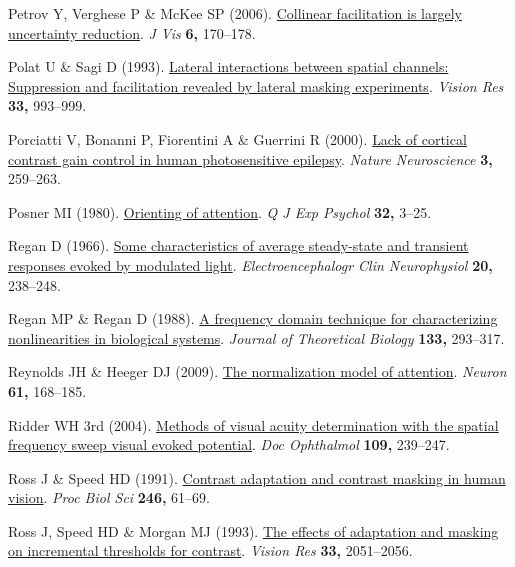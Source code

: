 \documentclass[
  letterpaper,
  DIV=11,
  numbers=noendperiod]{scrartcl}
\newlength{\cslhangindent}
\newenvironment{CSLReferences}[2] %
 {\begin{list}{}{%
  \setlength{\itemindent}{0pt}
  \setlength{\leftmargin}{0pt}
  \setlength{\parsep}{0pt}
  \ifodd #1
   \setlength{\leftmargin}{\cslhangindent}
   \setlength{\itemindent}{-1\cslhangindent}
  \fi
  \setlength{\itemsep}{#2\baselineskip}}}
 {\end{list}}
\begin{document}
\begin{CSLReferences}{1}{1}
Petrov Y, Verghese P \& McKee SP (2006).
\href{https://doi.org/10.1167/6.2.8}{Collinear facilitation is largely
uncertainty reduction}. \emph{J Vis} \textbf{6,} 170--178.

Polat U \& Sagi D (1993).
\href{https://doi.org/10.1016/0042-6989(93)90081-7}{Lateral interactions
between spatial channels: Suppression and facilitation revealed by
lateral masking experiments}. \emph{Vision Res} \textbf{33,} 993--999.

Porciatti V, Bonanni P, Fiorentini A \& Guerrini R (2000).
\href{https://doi.org/10.1038/72972}{Lack of cortical contrast gain
control in human photosensitive epilepsy}. \emph{Nature Neuroscience}
\textbf{3,} 259--263.

Posner MI (1980).
\href{https://doi.org/10.1080/00335558008248231}{Orienting of
attention}. \emph{Q J Exp Psychol} \textbf{32,} 3--25.

Regan D (1966). \href{https://doi.org/10.1016/0013-4694(66)90088-5}{Some
characteristics of average steady-state and transient responses evoked
by modulated light}. \emph{Electroencephalogr Clin Neurophysiol}
\textbf{20,} 238--248.

Regan MP \& Regan D (1988).
\href{https://doi.org/10.1016/S0022-5193(88)80323-0}{A frequency domain
technique for characterizing nonlinearities in biological systems}.
\emph{Journal of Theoretical Biology} \textbf{133,} 293--317.

Reynolds JH \& Heeger DJ (2009).
\href{https://doi.org/10.1016/j.neuron.2009.01.002}{The normalization
model of attention}. \emph{Neuron} \textbf{61,} 168--185.

Ridder WH 3rd (2004).
\href{https://doi.org/10.1007/s10633-004-8053-7}{Methods of visual
acuity determination with the spatial frequency sweep visual evoked
potential}. \emph{Doc Ophthalmol} \textbf{109,} 239--247.

Ross J \& Speed HD (1991).
\href{https://doi.org/10.1098/rspb.1991.0125}{Contrast adaptation and
contrast masking in human vision}. \emph{Proc Biol Sci} \textbf{246,}
61--69.

Ross J, Speed HD \& Morgan MJ (1993).
\href{https://doi.org/10.1016/0042-6989(93)90003-f}{The effects of
adaptation and masking on incremental thresholds for contrast}.
\emph{Vision Res} \textbf{33,} 2051--2056.


\end{CSLReferences}
\end{document}
